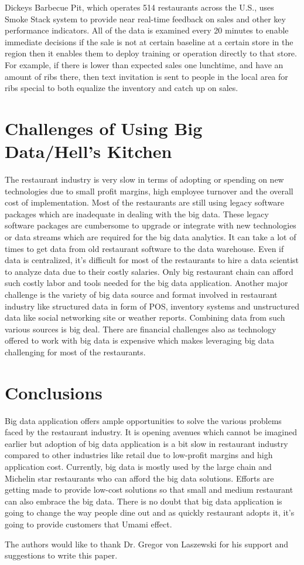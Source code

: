 \documentclass[sigconf]{acmart}
\begin{document}
 Dickeys Barbecue Pit, which operates 514 restaurants across the U.S., uses Smoke Stack system to provide near real-time feedback on sales and other key performance indicators. All of the data is examined every 20 minutes to enable immediate decisions if the sale is not at certain baseline at a certain store in the region then it enables them to deploy training or operation directly to that store. For example, if there is lower than expected sales one lunchtime, and have an amount of ribs there, then text invitation is sent to people in the local area for ribs special to both equalize the inventory and catch up on sales.\cite{www-forbes}

\section{Challenges of Using Big Data/Hell's Kitchen}
The restaurant industry is very slow in terms of adopting or spending on new technologies due to small profit margins, high employee turnover and the overall cost of implementation\cite{www-bostonglobe}. Most of the restaurants are still using legacy software packages which are inadequate in dealing with the big data. These legacy software packages are cumbersome to upgrade or integrate with new technologies or data streams which are required for the big data analytics. It can take a lot of times to get data from old restaurant software to the data warehouse. Even if data is centralized, it's difficult for most of the restaurants to hire a data scientist to analyze data due to their costly salaries. Only big restaurant chain can afford such costly labor and tools needed for the big data application\cite{2015BDLC}. Another major challenge is the variety of big data source and format involved in restaurant industry like structured data in form of POS, inventory systems and unstructured data like social networking site or weather reports. Combining data from such various sources is big deal. There are financial challenges also as technology offered to work with big data is expensive which makes leveraging big data challenging for most of the restaurants.\cite{www-foodnewsfeed}

\section{Conclusions}

Big data application offers ample opportunities to solve the various problems faced by the restaurant industry. It is opening avenues which cannot be imagined earlier but adoption of big data application is a bit slow in restaurant industry compared to other industries like retail due to low-profit margins and high application cost. Currently, big data is mostly used by the large chain and Michelin star restaurants who can afford the big data solutions. Efforts are getting made to provide low-cost solutions so that small and medium restaurant can also embrace the big data. There is no doubt that big data application is going to change the way people dine out and as quickly restaurant adopts it, it's going to provide customers that Umami effect.



\begin{acks}
  The authors would like to thank Dr. Gregor von Laszewski for his
  support and suggestions to write this paper.
\end{acks}



 
\end{document}
